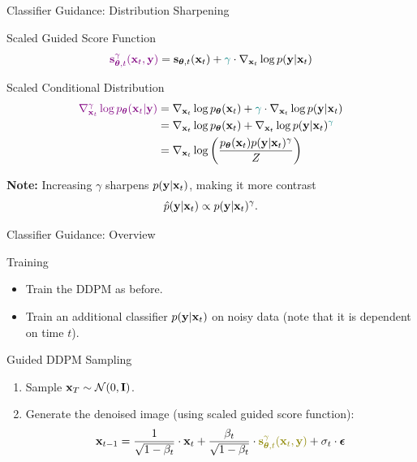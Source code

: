 \documentclass{beamer}
\renewcommand{\eqpause}{}
\renewcommand{\nextonslide}[1]{#1}
\begin{document}
\begin{frame}{Classifier Guidance: Distribution Sharpening}
	\begin{block}{Scaled Guided Score Function}
		\[
			{\color{violet}\mathbf{s}^{\gamma}_{\boldsymbol{\theta}, t}(\mathbf{x}_t, \mathbf{y})} = \mathbf{s}_{\boldsymbol{\theta}, t}(\mathbf{x}_t)+ {\color{teal}\gamma} \cdot \nabla_{\mathbf{x}_t} \log p(\mathbf{y} | \mathbf{x}_t)
		\]
		\vspace{-0.5cm}
	\end{block}
	\eqpause
	\begin{block}{Scaled Conditional Distribution}
		\vspace{-0.5cm}
		\begin{align*}
			{\color{violet}\nabla_{\bx_t}^{\gamma} \log \pt(\bx_t | \by)} 
			&= \nabla_{\bx_t} \log \pt(\bx_t) + {\color{teal}\gamma}  \cdot \nabla_{\bx_t} \log p(\by | \bx_t) \\
			\nextonslide{
			&= \nabla_{\bx_t} \log \pt(\bx_t) + \nabla_{\bx_t} \log p(\by | \bx_t)^{\color{teal}\gamma} \\
			}
			\nextonslide{
			&= \nabla_{\bx_t} \log \left( \frac{\pt(\bx_t) p(\by | \bx_t)^{\gamma}}{Z} \right)
			}
		\end{align*}
		\vspace{-0.3cm}
	\end{block}
	\eqpause
	\textbf{Note:} Increasing $\gamma$ sharpens $p(\mathbf{y} | \mathbf{x}_t)$, making it more contrast
	\[
		\hat{p}(\mathbf{y} | \mathbf{x}_t) \propto p(\mathbf{y} | \mathbf{x}_t)^{\gamma}.
	\]
\end{frame}
\begin{frame}{Classifier Guidance: Overview}

	\begin{block}{Training}
		\begin{itemize}
			\item Train the DDPM as before.
			\item Train an additional classifier $p(\mathbf{y} | \mathbf{x}_t)$ on noisy data (note that it is dependent on time $t$).
		\end{itemize}
		\vspace{-0.2cm}
	\end{block}
	\eqpause
	\begin{block}{Guided DDPM Sampling}
		\begin{enumerate}
			\item Sample $\mathbf{x}_T \sim \mathcal{N}(0, \mathbf{I})$.
			\item Generate the denoised image (using scaled guided score function):
			\[
				\bx_{t-1} = \frac{1}{\sqrt{1 - \beta_t}} \cdot \bx_t + \frac{\beta_t}{\sqrt{1 - \beta_t}} \cdot  {\color{olive}\bs^{\gamma}_{\btheta, t}(\bx_t, \by)} + \sigma_t \cdot \bepsilon
			\]
		\end{enumerate}
	\end{block}
\end{frame}
\end{document}
